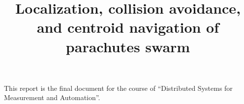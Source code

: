 \documentclass[conference]{IEEEtran}
\begin{document}
\title{Localization, collision avoidance, and centroid navigation of parachutes swarm}

\author{
\and
{}
}

\maketitle










This report is the final document for the course of “Distributed Systems for Measurement and Automation”.
\end{document}
